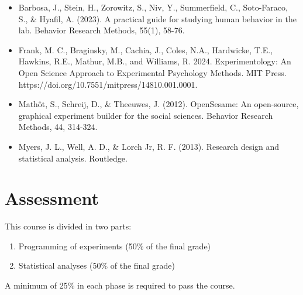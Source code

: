 \documentclass[
  letterpaper,
  DIV=11,
  numbers=noendperiod]{scrreprt}
\providecommand{\tightlist}{%
  \setlength{\itemsep}{0pt}\setlength{\parskip}{0pt}}\usepackage{longtable,booktabs,array}
\begin{document}
\begin{itemize}
\tightlist
\item
  Barbosa, J., Stein, H., Zorowitz, S., Niv, Y., Summerfield, C.,
  Soto-Faraco, S., \& Hyafil, A. (2023). A practical guide for studying
  human behavior in the lab. Behavior Research Methods, 55(1), 58-76.
\item
  Frank, M. C., Braginsky, M., Cachia, J., Coles, N.A., Hardwicke, T.E.,
  Hawkins, R.E., Mathur, M.B., and Williams, R. 2024. Experimentology:
  An Open Science Approach to Experimental Psychology Methods. MIT
  Press. https://doi.org/10.7551/mitpress/14810.001.0001.
\item
  Mathôt, S., Schreij, D., \& Theeuwes, J. (2012). OpenSesame: An
  open-source, graphical experiment builder for the social sciences.
  Behavior Research Methods, 44, 314-324.
\item
  Myers, J. L., Well, A. D., \& Lorch Jr, R. F. (2013). Research design
  and statistical analysis. Routledge.
\end{itemize}

\hypertarget{assessment}{%
\section{Assessment}\label{assessment}}

This course is divided in two parts:

\begin{enumerate}
\def\labelenumi{\arabic{enumi})}
\item
  Programming of experiments (50\% of the final grade)
\item
  Statistical analyses (50\% of the final grade)
\end{enumerate}

\begin{tcolorbox}[enhanced jigsaw, opacitybacktitle=0.6, arc=.35mm, colbacktitle=quarto-callout-warning-color!10!white, bottomrule=.15mm, titlerule=0mm, coltitle=black, title=\textcolor{quarto-callout-warning-color}{\faExclamationTriangle}\hspace{0.5em}{Important!}, toprule=.15mm, left=2mm, colback=white, rightrule=.15mm, bottomtitle=1mm, colframe=quarto-callout-warning-color-frame, opacityback=0, toptitle=1mm, breakable, leftrule=.75mm]

A minimum of 25\% in each phase is required to pass the course.

\end{tcolorbox}
\end{document}
